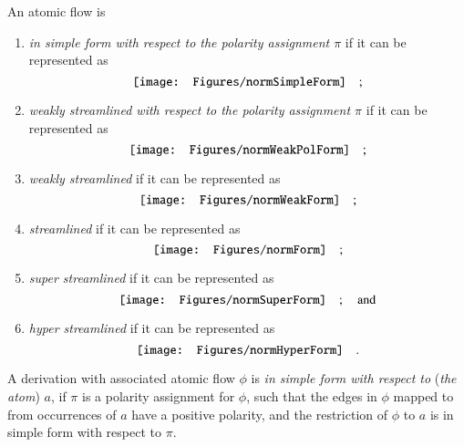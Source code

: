 \begin{definition}\label{definition:FlowNormalForms}
An atomic flow is
\begin{enumerate}
\item\label{definition:FlowNormalForms:item:SimpleForm}
\emph{in simple form with respect to the polarity assignment $\pi$} if it can be represented as
\[
\vcenter{\hbox{\texttt{[image: Figures/normSimpleForm]}}}
\quad;
\]
\item\label{definition:FlowNormalForms:item:WeaklyStreamlinedPolarity}
\emph{weakly streamlined with respect to the polarity assignment $\pi$} if it can be represented as
\[
\vcenter{\hbox{\texttt{[image: Figures/normWeakPolForm]}}}
\quad;
\]
\item\label{definition:FlowNormalForms:item:WeaklyStreamlined}
\emph{weakly streamlined} if it can be represented as
\[
\vcenter{\hbox{\texttt{[image: Figures/normWeakForm]}}}
\quad;
\]
\item\label{definition:FlowNormalForms:item:Streamlined}
\emph{streamlined} if it can be represented as
\[
\vcenter{\hbox{\texttt{[image: Figures/normForm]}}}
\quad;
\]
\item\label{definition:FlowNormalForms:item:SuperStreamlined}
\emph{super streamlined} if it can be represented as
\[
\vcenter{\hbox{\texttt{[image: Figures/normSuperForm]}}}
\quad;\quad\mbox{and}
\]
\item\label{definition:FlowNormalForms:item:HyperStreamlined}
\emph{hyper streamlined} if it can be represented as
\[
\vcenter{\hbox{\texttt{[image: Figures/normHyperForm]}}}
\quad.
\]
\end{enumerate}
\end{definition}

\begin{definition}\label{definition:DerSimpleForm}
A derivation with associated atomic flow $\phi$ is \emph{in simple form with respect to} (\emph{the atom}) $a$, if $\pi$ is a polarity assignment for $\phi$, such that the edges in $\phi$ mapped to from occurrences of $a$ have a positive polarity, and the restriction of $\phi$ to $a$ is in simple form with respect to $\pi$.
\end{definition}

